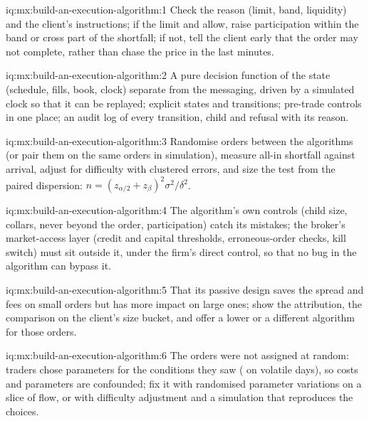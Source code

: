 \begin{solution}{iq:mx:build-an-execution-algorithm:1}
Check the reason (limit, band, liquidity) and the client's instructions; if the limit and  allow, raise participation within the band or cross
part of the shortfall; if not, tell the client early that the order may not complete, rather than chase the price in the last minutes.
\end{solution}

\begin{solution}{iq:mx:build-an-execution-algorithm:2}
A pure decision function of the state (schedule, fills, book, clock) separate from the messaging, driven by a simulated clock so that it can be
replayed; explicit states and transitions; pre-trade controls in one place; an audit log of every transition, child and refusal with its reason.
\end{solution}

\begin{solution}{iq:mx:build-an-execution-algorithm:3}
Randomise orders between the algorithms (or pair them on the same orders in simulation), measure all-in shortfall against arrival, adjust for
difficulty with clustered errors, and size the test from the paired dispersion: $n=(z_{\alpha/2}+z_\beta)^2\sigma^2/\delta^2$.
\end{solution}

\begin{solution}{iq:mx:build-an-execution-algorithm:4}
The algorithm's own controls (child size, collars, never beyond the order, participation) catch its mistakes; the broker's market-access layer
(credit and capital thresholds, erroneous-order checks, kill switch) must sit outside it, under the firm's direct control, so that no bug in the algorithm
can bypass it.
\end{solution}

\begin{solution}{iq:mx:build-an-execution-algorithm:5}
That its passive design saves the spread and fees on small orders but has more impact on large ones; show the attribution, the comparison on the
client's size bucket, and offer a lower  or a different algorithm for those orders.
\end{solution}

\begin{solution}{iq:mx:build-an-execution-algorithm:6}
The orders were not assigned at random: traders chose parameters for the conditions they saw ( on volatile days), so costs and parameters are
confounded; fix it with randomised parameter variations on a slice of flow, or with difficulty adjustment and a simulation that reproduces the choices.
\end{solution}
